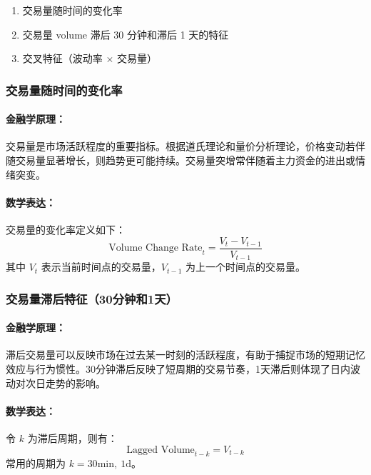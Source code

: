 \documentclass[a4paper,12pt]{ctexart}
\begin{document}
\begin{enumerate}
  \item 交易量随时间的变化率
  \item 交易量 volume 滞后 30 分钟和滞后 1 天的特征
  \item 交叉特征（波动率 $\times$ 交易量）
\end{enumerate}

\subsubsection{交易量随时间的变化率}

\paragraph{金融学原理：}

交易量是市场活跃程度的重要指标。根据道氏理论和量价分析理论，价格变动若伴随交易量显著增长，则趋势更可能持续。交易量突增常伴随着主力资金的进出或情绪突变。

\paragraph{数学表达：}

交易量的变化率定义如下：
\[
\text{Volume Change Rate}_t = \frac{V_t - V_{t-1}}{V_{t-1}}
\]
其中 $V_t$ 表示当前时间点的交易量，$V_{t-1}$ 为上一个时间点的交易量。




\newpage

\subsubsection{交易量滞后特征（30分钟和1天）}

\paragraph{金融学原理：}

滞后交易量可以反映市场在过去某一时刻的活跃程度，有助于捕捉市场的短期记忆效应与行为惯性。30分钟滞后反映了短周期的交易节奏，1天滞后则体现了日内波动对次日走势的影响。

\paragraph{数学表达：}

令 $k$ 为滞后周期，则有：
\[
\text{Lagged Volume}_{t-k} = V_{t-k}
\]
常用的周期为 $k = 30\text{min},\ 1\text{d}$。
\end{document}
